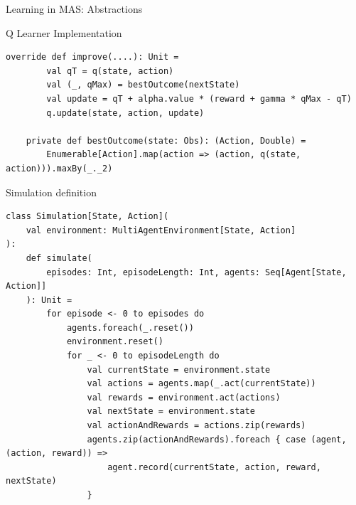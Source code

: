 \documentclass[presentation, 8pt]{beamer}\mode<presentation>{\usetheme{AMSBolognaFC}}
\begin{document}
\begin{frame}{Learning in MAS: Abstractions}
\begin{exampleblock}{Q Learner Implementation}
\begin{lstlisting}[style=scala]
	override def improve(....): Unit =
		val qT = q(state, action)
		val (_, qMax) = bestOutcome(nextState)
		val update = qT + alpha.value * (reward + gamma * qMax - qT)
		q.update(state, action, update)

	private def bestOutcome(state: Obs): (Action, Double) =
		Enumerable[Action].map(action => (action, q(state, action))).maxBy(_._2)

	\end{lstlisting}
\end{exampleblock}

\begin{exampleblock}{Simulation definition}
	\begin{lstlisting}[style=scala]
class Simulation[State, Action](
	val environment: MultiAgentEnvironment[State, Action]
):
	def simulate(
		episodes: Int, episodeLength: Int, agents: Seq[Agent[State, Action]]
	): Unit =
		for episode <- 0 to episodes do
			agents.foreach(_.reset())
			environment.reset()
			for _ <- 0 to episodeLength do
				val currentState = environment.state
				val actions = agents.map(_.act(currentState))
				val rewards = environment.act(actions)
				val nextState = environment.state
				val actionAndRewards = actions.zip(rewards)
				agents.zip(actionAndRewards).foreach { case (agent, (action, reward)) =>
					agent.record(currentState, action, reward, nextState)
				}
\end{lstlisting}
\end{exampleblock}
\end{frame}
\end{document}
